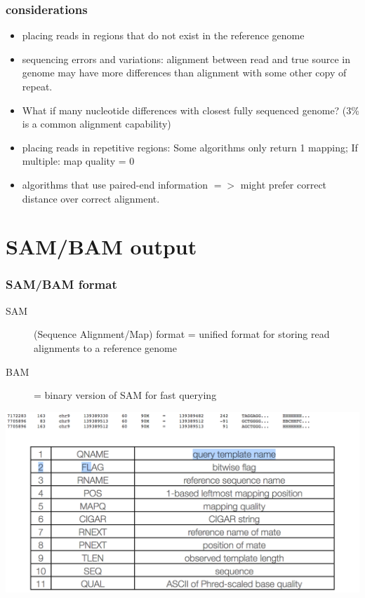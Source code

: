 \documentclass[pdf]{beamer}
\begin{document}
\begin{frame}
\frametitle{considerations}
\begin{itemize}
\item placing reads in regions that do not exist in the reference genome
\item sequencing errors and variations: alignment between read and true source in genome may have more differences than alignment with some other copy of repeat.
\item What if many nucleotide differences with closest fully sequenced genome? (3\% is a common alignment capability)
\item placing reads in repetitive regions: Some algorithms only return 1 mapping; If multiple: map quality = 0
\item algorithms that use paired-end information $=>$ might prefer correct distance over correct alignment.
\end{itemize}
\end{frame}

\section{SAM/BAM output}
\begin{frame}
\frametitle{SAM/BAM format}
\begin{description}
\item [SAM] (Sequence Alignment/Map) format = unified format for storing read alignments to a reference genome
\item [BAM] = binary version of SAM for fast querying
\end{description}
\end{frame}

\begin{frame}
\begin{center}
\includegraphics[scale=0.25]{Figures/sam.png} 
\end{center}
\end{frame}
\end{document}
